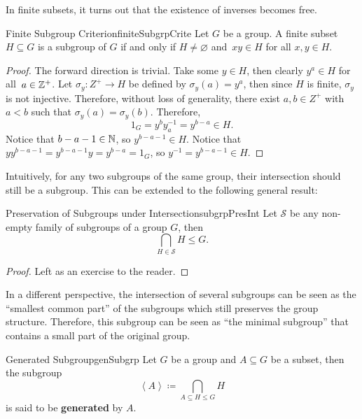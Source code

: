 \documentclass[math]{amznotes}
\theoremstyle{remark}
\newcommand{\0}{\mathbf{0}}
\newcommand{\1}{\mathbf{1}}
\begin{document}
In finite subsets, it turns out that the existence of inverses becomes free.
\begin{probox}{Finite Subgroup Criterion}{finiteSubgrpCrite}
    Let $G$ be a group. A finite subset $H \subseteq G$ is a subgroup of $G$ if and only if $H \neq \varnothing$ and~$xy \in H$ for all $x, y \in H$.
    \tcblower
    \begin{proof}
        The forward direction is trivial. Take some $y \in H$, then clearly $y^a \in H$ for all~$a \in \mathbb{Z}^+$. Let $\sigma_y \colon Z^+ \to H$ be defined by $\sigma_y\left(a\right) = y^a$, then since $H$ is finite, $\sigma_y$ is not injective. Therefore, without loss of generality, there exist $a, b \in Z^+$ with $a < b$ such that $\sigma_y\left(a\right) = \sigma_y\left(b\right)$. Therefore, 
        \begin{equation*}
            1_G = y^by_a^{-1} = y^{b - a} \in H.
        \end{equation*}
        Notice that $b - a - 1 \in \mathbb{N}$, so $y^{b - a - 1} \in H$. Notice that $yy^{b - a - 1} = y^{b - a - 1}y = y^{b - a} = 1_G$, so $y^{-1} = y^{b - a - 1} \in H$.
    \end{proof}
\end{probox}
Intuitively, for any two subgroups of the same group, their intersection should still be a subgroup. This can be extended to the following general result:
\begin{probox}{Preservation of Subgroups under Intersection}{subgrpPresInt}
    Let $\mathcal{S}$ be any non-empty family of subgroups of a group $G$, then
    \begin{equation*}
        \bigcap_{H \in \mathcal{S}}H \leq G.
    \end{equation*}
    \tcblower
    \begin{proof}
        Left as an exercise to the reader.
    \end{proof}
\end{probox}
In a different perspective, the intersection of several subgroups can be seen as the ``smallest common part'' of the subgroups which still preserves the group structure. Therefore, this subgroup can be seen as ``the minimal subgroup'' that contains a small part of the original group.
\begin{dfnbox}{Generated Subgroup}{genSubgrp}
    Let $G$ be a group and $A \subseteq G$ be a subset, then the subgroup 
    \begin{equation*}
        \left\langle A \right\rangle \coloneqq \bigcap_{A \subseteq H \leq G}H
    \end{equation*}
    is said to be {\color{red} \textbf{generated}} by $A$.
\end{dfnbox}
\end{document}
